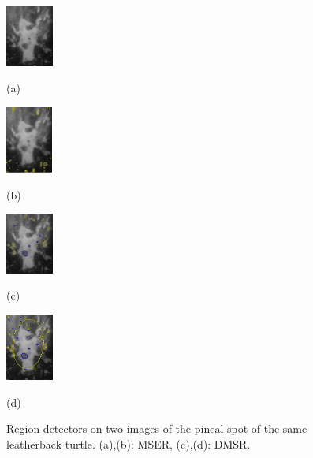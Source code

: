 \documentclass{article}
\begin{document}
\begin{figure}[htb]

\begin{minipage}[b]{.24\linewidth}
  \centering
  \centerline{\includegraphics[height=2.0cm]{./Figs/mserLeatherbackA}}
   \centerline{(a)}\medskip
\end{minipage}
\hfill
\begin{minipage}[b]{0.24\linewidth}
  \centering
  \centerline{\includegraphics[height=2.2cm]{./Figs/mserLeatherbackB}}
\centerline{(b)}\medskip
\end{minipage}
\hfill
\begin{minipage}[b]{.24\linewidth}
  \centering
  \centerline{\includegraphics[height=2.0cm]{./Figs/dmsrLeatherbackA}}
\centerline{(c)}\medskip
\end{minipage}
\hfill
\begin{minipage}[b]{0.24\linewidth}
  \centering
  \centerline{\includegraphics[height=2.2cm]{./Figs/dmsrLeatherbackB}}
 \centerline{(d)}\medskip
\end{minipage}
 \vspace{-0.4cm} 
\caption{Region detectors on two images of the pineal spot of the same leatherback turtle.
(a),(b): MSER, (c),(d): DMSR. }
\label{fig:turtle}
 \vspace{-0.2cm}
\end{figure}
\end{document}
